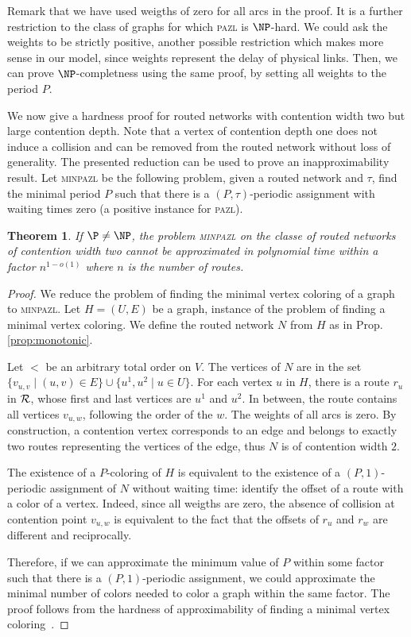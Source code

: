 \documentclass[a4paper,10pt]{article}
\newtheorem{theorem}{Theorem}
\newcommand\pazl{\textsc{pazl}\xspace}
\newcommand\minpazl{\textsc{minpazl}\xspace}
\begin{document}
 Remark that we have used weigths of zero for all arcs in the proof. It is a further restriction to the 
 class of graphs for which \pazl is $\NP$-hard. We could ask the weights to be strictly positive, another possible restriction which makes more sense in our model, since weights represent the delay of physical links. Then, we can prove $\NP$-completness using the same proof, by setting all weights to the period $P$.

We now give a hardness proof for routed networks with contention width two but large contention depth. Note that a vertex of contention depth one does not induce a collision and can be removed from the routed network without loss of generality. The presented reduction can be used to prove an inapproximability result. Let \minpazl be the following problem, given a routed network and $\tau$, find the minimal period $P$ such that there is a $(P,\tau)$-periodic assignment with waiting times zero (a positive instance for \pazl). 


\begin{theorem}\label{th:inapprox}
If $\P \neq \NP$, the problem \minpazl on the classe of routed networks of contention width two cannot be approximated in polynomial time within a factor $n^{1-o(1)}$ where $n$ is the number of routes.
\end{theorem}

\begin{proof}
 We reduce the problem of finding the minimal vertex coloring of a graph to \minpazl. Let $H = (U,E)$ be a graph, instance of the problem of finding a minimal vertex coloring.  We define the routed network $N$ from $H$ as in Prop.\ref{prop:monotonic}.
 
 Let $<$ be an arbitrary total order on $V$. 
 The vertices of $N$ are in the set $\{v_{u,v} \mid (u,v) \in E\} \cup \{u^1, u^2 \mid u \in U\}$. 
 For each vertex $u$ in $H$, there is a route $r_u$ in ${\cal R}$, whose first and last vertices
 are $u^1$ and $u^2$. In between, the route contains all vertices $v_{u,w}$, following the order of the $w$.
 The weights of all arcs is zero. By construction, a contention vertex corresponds to an edge and belongs to exactly two routes representing the vertices of the edge, thus $N$ is of contention width $2$.

  The existence of a $P$-coloring of $H$ is equivalent to the existence of a $(P,1)$-periodic assignment of $N$ without waiting time: identify the offset of a route with a color of a vertex. Indeed, since all weigths are zero, the absence of collision at contention point $v_{u,w}$ is equivalent to the fact that the offsets of $r_u$ and $r_w$ are different and reciprocally.

   Therefore, if we can approximate the minimum value of $P$ within some factor such that there is a $(P,1)$-periodic assignment, we could approximate the minimal number of colors needed to color a graph within the same factor. The proof follows from the hardness of approximability of finding a minimal vertex coloring~\cite{zuckerman2006linear}.
\end{proof}
\end{document}
